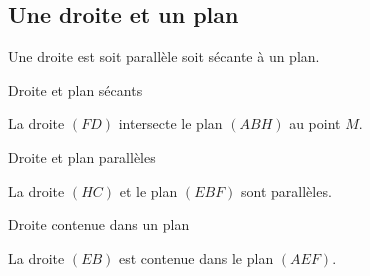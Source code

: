 \subsection{Une droite et un plan}

Une droite est soit parallèle soit sécante à un plan.

\begin{multicols}{2}

    \begin{center}
        Droite et plan sécants
    \end{center}

    La droite \( (FD)\) intersecte le plan \( (ABH)\) au point \( M\).

    \columnbreak
    \begin{center}

    \end{center}
\end{multicols}


\begin{multicols}{2}

    \begin{center}
        Droite et plan parallèles
    \end{center}

    La droite \( (HC)\) et le plan \( (EBF)\) sont parallèles.

    \columnbreak
    \begin{center}

    \end{center}
\end{multicols}

\begin{multicols}{2}

    \begin{center}
        Droite contenue dans un plan
    \end{center}

    La droite \( (EB)\) est contenue dans le plan \( (AEF)\).

    \columnbreak
    \begin{center}

    \end{center}
\end{multicols}


